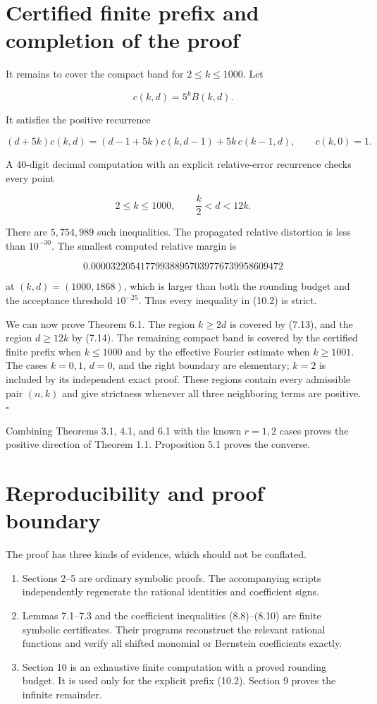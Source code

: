 \documentclass[11pt]{article}
\numberwithin{equation}{section}
\begin{document}
\section{Certified finite prefix and completion of the proof}


It remains to cover the compact band for $2\le k\le1000$. Let

\[
c(k,d)=5^kB(k,d).
\]

It satisfies the positive recurrence

\[
(d+5k)c(k,d)=(d-1+5k)c(k,d-1)+5k\,c(k-1,d),
\qquad
c(k,0)=1.
\tag{10.1}
\]

A 40-digit decimal computation with an explicit relative-error recurrence checks every
point

\[
2\le k\le1000,
\qquad
\frac{k}{2}<d<12k.
\tag{10.2}
\]

There are $5,754,989$ such inequalities. The propagated relative distortion is less than
$10^{-30}$. The smallest computed relative margin is

\[
0.000032205417799388957039776739958609472
\]

at $(k,d)=(1000,1868)$, which is larger than both the rounding budget and the acceptance
threshold $10^{-25}$. Thus every inequality in (10.2) is strict.

We can now prove Theorem 6.1. The region $k\ge2d$ is covered by (7.13), and the region
$d\ge12k$ by (7.14). The remaining compact band is covered by the certified finite prefix
when $k\le1000$ and by the effective Fourier estimate when $k\ge1001$. The cases
$k=0,1$, $d=0$, and the right boundary are elementary; $k=2$ is included by its
independent exact proof. These regions contain every admissible pair $(n,k)$ and give
strictness whenever all three neighboring terms are positive. $\square$

Combining Theorems 3.1, 4.1, and 6.1 with the known $r=1,2$ cases proves the positive
direction of Theorem 1.1. Proposition 5.1 proves the converse.

\section{Reproducibility and proof boundary}


The proof has three kinds of evidence, which should not be conflated.

\begin{enumerate}
\item Sections 2--5 are ordinary symbolic proofs. The accompanying scripts independently
regenerate the rational identities and coefficient signs.
\item Lemmas 7.1--7.3 and the coefficient inequalities (8.8)--(8.10) are finite symbolic
certificates. Their programs reconstruct the relevant rational functions and verify all
shifted monomial or Bernstein coefficients exactly.
\item Section 10 is an exhaustive finite computation with a proved rounding budget. It is
used only for the explicit prefix (10.2). Section 9 proves the infinite remainder.

\end{enumerate}
\end{document}
